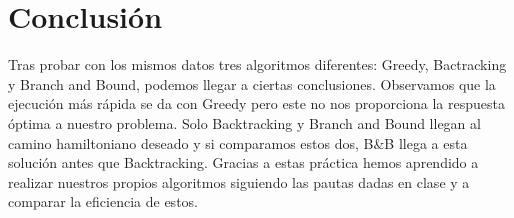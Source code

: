\documentclass[a4]{article}
\begin{document}
\begin{figure}[H]
  \centering
\end{figure}

\section{Conclusión}
Tras probar con los mismos datos tres algoritmos diferentes: Greedy, Bactracking y Branch and Bound, podemos llegar a ciertas conclusiones. Observamos que la ejecución más rápida se da con Greedy pero este no nos proporciona la respuesta óptima a nuestro problema. Solo Backtracking y Branch and Bound llegan al camino hamiltoniano deseado y si comparamos estos dos, B\&B llega a esta solución antes que Backtracking. Gracias a estas práctica hemos aprendido a realizar nuestros propios algoritmos siguiendo las pautas dadas en clase y a comparar la eficiencia de estos.
\end{document}
